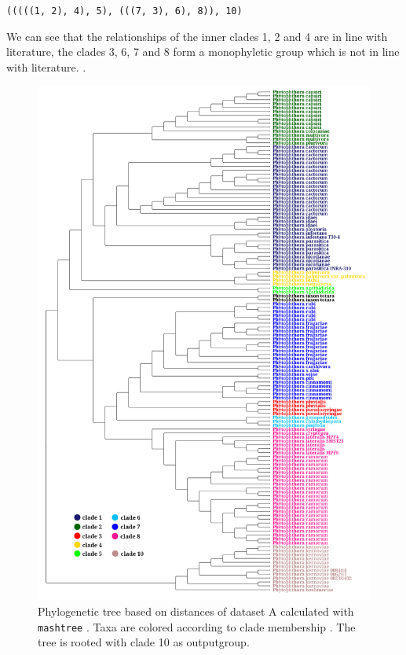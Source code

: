 \texttt{(((((1, 2), 4), 5), (((7, 3), 6), 8)), 10)}

We can see that the relationships of the inner clades 1, 2 and 4 are in line
with literature, the clades 3, 6, 7 and 8 form a monophyletic group which is not
in line with literature.
\cite{abadPhytophthoraTaxonomicPhylogenetic2023a,yangExpandedPhylogenyGenus2017}.

\begin{figure}
  \centering
  \includegraphics[width=1.0\textwidth]{figures/mashtree_mandal_tree_k21_s2000.png}
  \caption{Phylogenetic tree based on distances of dataset A calculated with
  \texttt{mashtree}
  \cite{ondovMashFastGenome2016,katzMashtreeRapidComparison2019}. Taxa are
  colored according to clade membership
  \cite{abadPhytophthoraTaxonomicPhylogenetic2023a}. The tree is rooted with
  clade 10 as outputgroup.}
  \label{fig:mandalMashTree}
\end{figure}

